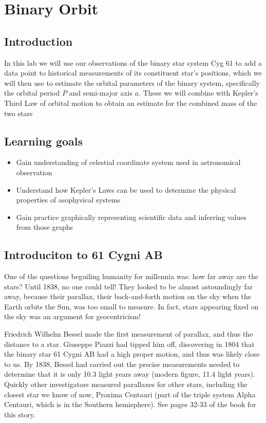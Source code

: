 \chapter{Binary Orbit}

\section{Introduction}

In this lab we will use our observations of the binary star system Cyg 61 to add a data point to historical measurements of its constituent star's positions, which we will then use to estimate the orbital parameters of the binary system, specifically the orbital period $P$ and semi-major axis $a$. These we will combine with Kepler's Third Law of orbital motion to obtain an estimate for the combined mass of the two stars

\section{Learning goals}

\begin{itemize}
\item Gain understanding of celestial coordinate system used in astronomical observation
\item Understand how Kepler's Laws can be used to determine the physical properties of asophysical systems
\item Gain practice graphically representing scientific data and inferring values from those graphs
\end{itemize}

\section{Introduciton to 61 Cygni AB}
One of the questions beguiling humanity for millennia was: how far away are the stars?  Until 1838, no one could tell!  They looked to be almost astoundingly far away, because their parallax, their back-and-forth motion on the sky when the Earth orbits the Sun, was too small to measure.  In fact, stars appearing fixed on the sky was an argument for geocentricism!

Friedrich Wilhelm Bessel made the first measurement of parallax, and thus the distance to a star. Giuseppe Piazzi had tipped him off, discovering in 1804 that the binary star 61 Cygni AB had a high proper motion, and thus was likely close to us. By 1838, Bessel had carried out the precise measurements needed to determine that it is only 10.3 light years away (modern figure, 11.4 light years).  Quickly other investigators measured parallaxes for other stars, including the closest star we know of now, Proxima Centauri (part of the triple system Alpha Centauri, which is in the Southern hemisphere).  See pages 32-33 of the book for this story. 

